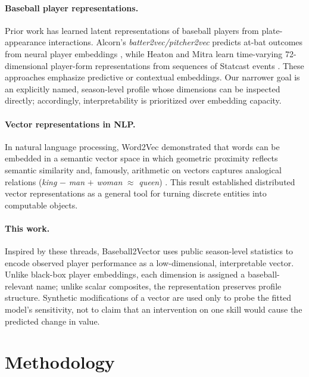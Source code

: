 \documentclass[10pt,twocolumn,letterpaper]{article}
\begin{document}
\paragraph{Baseball player representations.}
Prior work has learned latent representations of baseball players from plate-appearance interactions. Alcorn's \emph{batter2vec/pitcher2vec} predicts at-bat outcomes from neural player embeddings \cite{alcorn2016}, while Heaton and Mitra learn time-varying 72-dimensional player-form representations from sequences of Statcast events \cite{heaton2021}. These approaches emphasize predictive or contextual embeddings. Our narrower goal is an explicitly named, season-level profile whose dimensions can be inspected directly; accordingly, interpretability is prioritized over embedding capacity.

\paragraph{Vector representations in NLP.}
In natural language processing, Word2Vec demonstrated that words can be embedded in a semantic vector space in which geometric proximity reflects semantic similarity and, famously, arithmetic on vectors captures analogical relations (\emph{king} $-$ \emph{man} $+$ \emph{woman} $\approx$ \emph{queen}) \cite{mikolov2013}. This result established distributed vector representations as a general tool for turning discrete entities into computable objects.

\paragraph{This work.}
Inspired by these threads, Baseball2Vector uses public season-level statistics to encode observed player performance as a low-dimensional, interpretable vector. Unlike black-box player embeddings, each dimension is assigned a baseball-relevant name; unlike scalar composites, the representation preserves profile structure. Synthetic modifications of a vector are used only to probe the fitted model's sensitivity, not to claim that an intervention on one skill would cause the predicted change in value.

\section{Methodology}
\label{sec:method}
\end{document}
